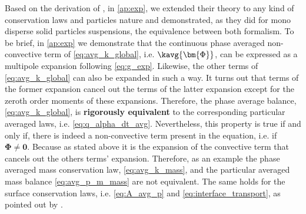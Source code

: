 Based on the derivation of \citet{nott2011suspension}, in \ref{ap:exp}, we extended their theory to any kind of conservation laws and particles nature and demonstrated, as they did for mono disperse solid particles suspensions, the equivalence between both formalism. 
To be brief, in \ref{ap:exp} we demonstrate that the continuous phase averaged non-convective term of \ref{eq:avg_k_global}, i.e.  $\kavg{\bm{\Phi}}$, can  be expressed as a multipole expansion following \ref{eq:g_exp}.
Likewise, the other terms of \ref{eq:avg_k_global} can also be expanded in such a way. 
It turns out that terms of the former expansion cancel out the terms of the latter expansion except for the zeroth order moments of these expansions.
Therefore, the phase average balance, \ref{eq:avg_k_global}, is \textbf{rigorously equivalent} to the corresponding particular averaged laws, i.e. \ref{eq:q_alpha_dt_avg}.
Nevertheless, this property is true if and only if, there is indeed a non-convective term present in the equation, i.e. if $\bm{\Phi} \neq \textbf{0}$. Because as stated above it is the expansion of the convective term that cancels out the others terms' expansion.
Therefore, as an example the phase averaged mass conservation law, \ref{eq:avg_k_mass}, and the particular averaged mass balance \ref{eq:avg_p_m_mass} are not equivalent. 
The same holds for the surface conservation laws, i.e. \ref{eq:A_avg_p} and \ref{eq:interface_transport}, as pointed out by \citet{lhuillier2000bilan}.

